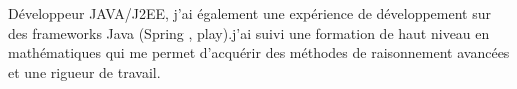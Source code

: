 %
%
%
\par{
	Développeur JAVA/J2EE, j'ai également une expérience de développement sur des frameworks Java (Spring , play).j'ai suivi une formation de haut niveau en mathématiques qui me permet d'acquérir des méthodes de raisonnement avancées et une rigueur de travail.
}